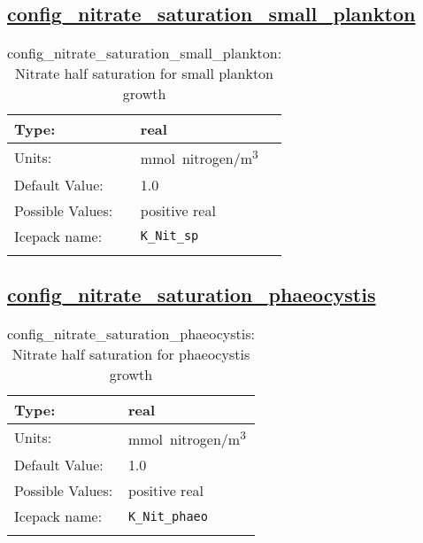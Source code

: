 \subsection[config\_nitrate\_saturation\_small\_plankton]{\hyperref[sec:nm_tab_biogeochemistry]{config\_nitrate\_saturation\_small\_plankton}}
\label{subsec:nm_sec_config_nitrate_saturation_small_plankton}
\begin{center}
\begin{longtable}{| p{2.0in} || p{4.0in} |}
    \hline
    Type: & real \\
    \hline
    Units: & \si{mmol.nitrogen/m^3} \\
    \hline
    Default Value: & 1.0 \\
    \hline
    Possible Values: & positive real \\
    \hline
    Icepack name: & \verb+K_Nit_sp+ \\
    \hline
    \caption{config\_nitrate\_saturation\_small\_plankton: Nitrate half saturation for small plankton growth}
\end{longtable}
\end{center}
\subsection[config\_nitrate\_saturation\_phaeocystis]{\hyperref[sec:nm_tab_biogeochemistry]{config\_nitrate\_saturation\_phaeocystis}}
\label{subsec:nm_sec_config_nitrate_saturation_phaeocystis}
\begin{center}
\begin{longtable}{| p{2.0in} || p{4.0in} |}
    \hline
    Type: & real \\
    \hline
    Units: & \si{mmol.nitrogen/m^3} \\
    \hline
    Default Value: & 1.0 \\
    \hline
    Possible Values: & positive real \\
    \hline
    Icepack name: & \verb+K_Nit_phaeo+ \\
    \hline
    \caption{config\_nitrate\_saturation\_phaeocystis: Nitrate half saturation for phaeocystis growth}
\end{longtable}
\end{center}
